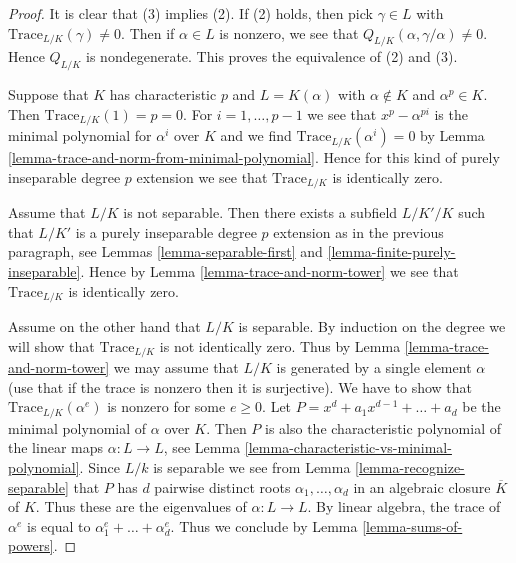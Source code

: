 \documentclass{stacks-project}
\theoremstyle{plain}
\theoremstyle{definition}
\theoremstyle{remark}
\numberwithin{equation}{subsection}
\begin{document}
\begin{proof}
It is clear that (3) implies (2). If (2) holds, then pick $\gamma \in L$
with $\text{Trace}_{L/K}(\gamma) \not = 0$. Then if $\alpha \in L$
is nonzero, we see that $Q_{L/K}(\alpha, \gamma/\alpha) \not = 0$.
Hence $Q_{L/K}$ is nondegenerate. This proves the equivalence of
(2) and (3).

\medskip\noindent
Suppose that $K$ has characteristic $p$ and $L = K(\alpha)$ with
$\alpha \not \in K$ and $\alpha^p \in K$. Then $\text{Trace}_{L/K}(1) = p = 0$.
For $i = 1, \ldots, p - 1$ we see that $x^p - \alpha^{pi}$ is the minimal
polynomial for $\alpha^i$ over $K$ and we find
$\text{Trace}_{L/K}(\alpha^i) = 0$ by
Lemma \ref{lemma-trace-and-norm-from-minimal-polynomial}.
Hence for this kind of purely inseparable degree $p$ extension
we see that $\text{Trace}_{L/K}$ is identically zero.

\medskip\noindent
Assume that $L/K$ is not separable. Then there exists a subfield
$L/K'/K$ such that $L/K'$ is a purely inseparable degree $p$ extension
as in the previous paragraph, see
Lemmas \ref{lemma-separable-first} and \ref{lemma-finite-purely-inseparable}.
Hence by Lemma \ref{lemma-trace-and-norm-tower}
we see that $\text{Trace}_{L/K}$ is identically zero.

\medskip\noindent
Assume on the other hand that $L/K$ is separable.
By induction on the degree we will show that
$\text{Trace}_{L/K}$ is not identically zero.
Thus by Lemma \ref{lemma-trace-and-norm-tower} we may assume that
$L/K$ is generated by a single element $\alpha$ (use that if
the trace is nonzero then it is surjective).
We have to show that $\text{Trace}_{L/K}(\alpha^e)$
is nonzero for some $e \geq 0$.
Let $P = x^d + a_1 x^{d - 1} + \ldots + a_d$ be the minimal
polynomial of $\alpha$ over $K$.
Then $P$ is also the characteristic polynomial of the linear
maps $\alpha : L \to L$, see
Lemma \ref{lemma-characteristic-vs-minimal-polynomial}.
Since $L/k$ is separable we see from Lemma \ref{lemma-recognize-separable}
that $P$ has $d$ pairwise distinct roots $\alpha_1, \ldots, \alpha_d$
in an algebraic closure $\overline{K}$ of $K$. Thus these are the
eigenvalues of $\alpha : L \to L$.
By linear algebra, the trace of $\alpha^e$ is
equal to $\alpha_1^e + \ldots + \alpha_d^e$.
Thus we conclude by Lemma \ref{lemma-sums-of-powers}.
\end{proof}
\end{document}
